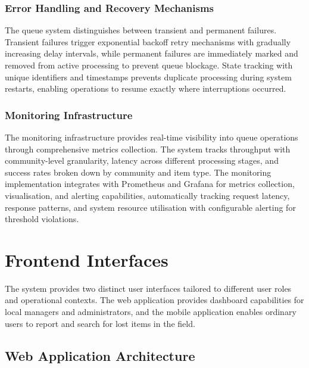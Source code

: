 \subsubsection{Error Handling and Recovery Mechanisms}

The queue system distinguishes between transient and permanent failures. Transient failures trigger exponential backoff retry mechanisms with gradually increasing delay intervals, while permanent failures are immediately marked and removed from active processing to prevent queue blockage. State tracking with unique identifiers and timestamps prevents duplicate processing during system restarts, enabling operations to resume exactly where interruptions occurred.

\subsubsection{Monitoring Infrastructure}

The monitoring infrastructure provides real-time visibility into queue operations through comprehensive metrics collection. The system tracks throughput with community-level granularity, latency across different processing stages, and success rates broken down by community and item type. The monitoring implementation integrates with Prometheus and Grafana for metrics collection, visualisation, and alerting capabilities, automatically tracking request latency, response patterns, and system resource utilisation with configurable alerting for threshold violations.


\section{Frontend Interfaces} \label{section:frontend_interfaces}

The system provides two distinct user interfaces tailored to different user roles and operational contexts. The web application provides dashboard capabilities for local managers and administrators, and the mobile application enables ordinary users to report and search for lost items in the field.

\subsection{Web Application Architecture} \label{subsection:web_application}

